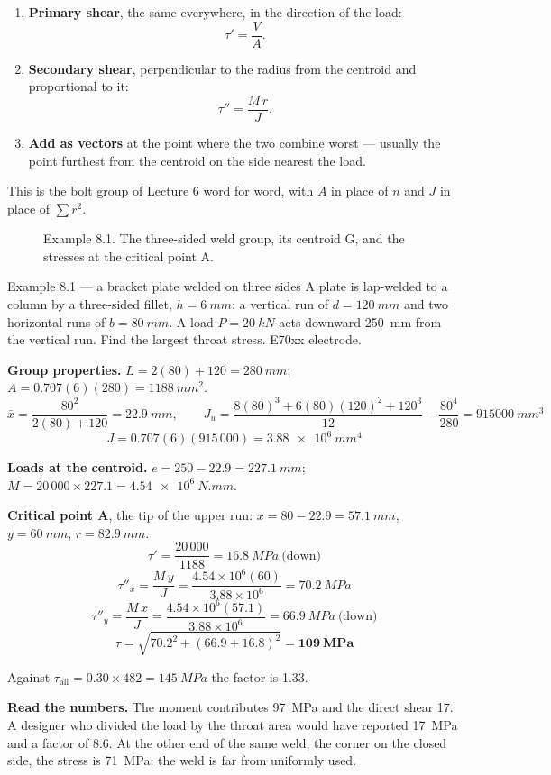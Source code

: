 \documentclass[11pt,a4paper]{article}
\begin{document}
\begin{enumerate}[leftmargin=*,itemsep=2pt]
\item \textbf{Primary shear}, the same everywhere, in the direction of the load:
  \[ \tau'=\frac{V}{A}. \]
\item \textbf{Secondary shear}, perpendicular to the radius from the centroid and proportional to it:
  \[ \tau''=\frac{M\,r}{J}. \]
\item \textbf{Add as vectors} at the point where the two combine worst --- usually the point
  furthest from the centroid on the side nearest the load.
\end{enumerate}

This is the bolt group of Lecture 6 word for word, with $A$ in place of $n$ and $J$ in place of
$\sum r^2$.

\begin{figure}[H]\centering
\resizebox{0.72\textwidth}{!}{}
\caption{Example 8.1. The three-sided weld group, its centroid G, and the stresses at the critical
point A.}
\label{fig:torsion}
\end{figure}

\begin{examplebox}{Example 8.1 --- a bracket plate welded on three sides}
A plate is lap-welded to a column by a three-sided fillet, $h=\SI{6}{mm}$: a vertical run of
$d=\SI{120}{mm}$ and two horizontal runs of $b=\SI{80}{mm}$. A load $P=\SI{20}{kN}$ acts downward
\SI{250}{mm} from the vertical run. Find the largest throat stress. E70xx electrode.

\medskip
\textbf{Group properties.} $L=2(80)+120=\SI{280}{mm}$; \ $A=0.707(6)(280)=\SI{1188}{mm^2}$.
\[ \bar x=\frac{80^2}{2(80)+120}=\SI{22.9}{mm},\qquad
   J_u=\frac{8(80)^3+6(80)(120)^2+120^3}{12}-\frac{80^4}{280}=\SI{915000}{mm^3} \]
\[ J=0.707(6)(915\,000)=\SI{3.88e6}{mm^4} \]

\textbf{Loads at the centroid.} $e=250-22.9=\SI{227.1}{mm}$; \ $M=20\,000\times227.1=\SI{4.54e6}{N.mm}$.

\textbf{Critical point A}, the tip of the upper run: $x=80-22.9=\SI{57.1}{mm}$, $y=\SI{60}{mm}$,
$r=\SI{82.9}{mm}$.
\[ \tau'=\frac{20\,000}{1188}=\SI{16.8}{MPa}\ \text{(down)} \]
\[ \tau''_x=\frac{M\,y}{J}=\frac{4.54\times10^{6}(60)}{3.88\times10^{6}}=\SI{70.2}{MPa} \]
\[ \tau''_y=\frac{M\,x}{J}=\frac{4.54\times10^{6}(57.1)}{3.88\times10^{6}}=\SI{66.9}{MPa}\ \text{(down)} \]
\[ \tau=\sqrt{70.2^2+(66.9+16.8)^2}=\mathbf{\SI{109}{MPa}} \]

Against $\tau_{\text{all}}=0.30\times482=\SI{145}{MPa}$ the factor is 1.33.

\medskip
\textbf{Read the numbers.} The moment contributes \SI{97}{MPa} and the direct shear 17. A designer
who divided the load by the throat area would have reported \SI{17}{MPa} and a factor of 8.6. At
the other end of the same weld, the corner on the closed side, the stress is \SI{71}{MPa}: the weld
is far from uniformly used.
\end{examplebox}
\end{document}
